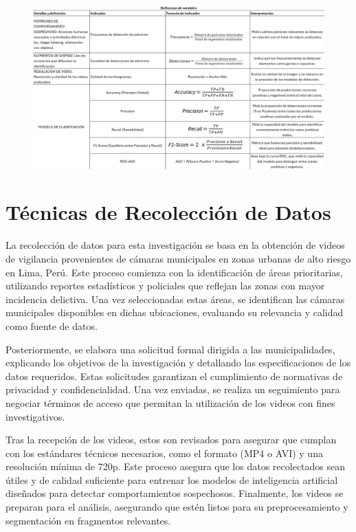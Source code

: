 \documentclass[listof=nochaptergap,12pt,times,authoryear]{report}
\begin{document}
\begin{figure}
    \centering
    \includegraphics[width=1.1\linewidth]{tabla try.png}
\end{figure}

\chapter{Técnicas de Recolección de Datos}
La recolección de datos para esta investigación se basa en la obtención de videos de vigilancia provenientes de cámaras municipales en zonas urbanas de alto riesgo en Lima, Perú. Este proceso comienza con la identificación de áreas prioritarias, utilizando reportes estadísticos y policiales que reflejan las zonas con mayor incidencia delictiva. Una vez seleccionadas estas áreas, se identifican las cámaras municipales disponibles en dichas ubicaciones, evaluando su relevancia y calidad como fuente de datos.

Posteriormente, se elabora una solicitud formal dirigida a las municipalidades, explicando los objetivos de la investigación y detallando las especificaciones de los datos requeridos. Estas solicitudes garantizan el cumplimiento de normativas de privacidad y confidencialidad. Una vez enviadas, se realiza un seguimiento para negociar términos de acceso que permitan la utilización de los videos con fines investigativos.

Tras la recepción de los videos, estos son revisados para asegurar que cumplan con los estándares técnicos necesarios, como el formato (MP4 o AVI) y una resolución mínima de 720p. Este proceso asegura que los datos recolectados sean útiles y de calidad suficiente para entrenar los modelos de inteligencia artificial diseñados para detectar comportamientos sospechosos. Finalmente, los videos se preparan para el análisis, asegurando que estén listos para su preprocesamiento y segmentación en fragmentos relevantes.
\end{document}
